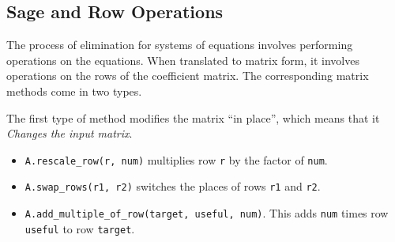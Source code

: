 \documentclass[10pt,]{book}
\theoremstyle{plain}
\theoremstyle{definition}
\numberwithin{equation}{section}
\begin{document}
\subsection[Sage and Row Operations]{Sage and Row Operations}\label{subsection-27}

        The process of elimination for systems of equations involves performing
        operations on the equations. When translated to matrix form, it involves
        operations on the rows of the coefficient matrix. The corresponding
        matrix methods come in two types.
\par

        The first type of method modifies the matrix ``in place'', which means
        that it \emph{Changes the input matrix}.
\begin{itemize}
\item{}\verb?A.rescale_row(r, num)? multiplies row \verb?r? by the factor of \verb?num?.\item{}\verb?A.swap_rows(r1, r2)? switches the places of rows \verb?r1? and \verb?r2?.\item{}\verb?A.add_multiple_of_row(target, useful, num)?. This adds \verb?num?
          times row \verb?useful? to row \verb?target?.\end{itemize}
\par
\end{document}
